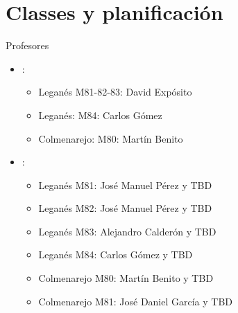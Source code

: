 \section{Classes y planificación}

\begin{frame}[t]{Profesores}
\begin{itemize}
  \item {}: 
    \begin{itemize}
      \item Leganés M81-82-83: David Expósito
      \item Leganés: M84: Carlos Gómez
      \item Colmenarejo: M80: Martín Benito
    \end{itemize}
  \item {}: 
    \begin{itemize}
      \item Leganés M81: José Manuel Pérez y TBD
      \item Leganés M82: José Manuel Pérez y TBD
      \item Leganés M83: Alejandro Calderón y TBD
      \item Leganés M84: Carlos Gómez y TBD
      \item Colmenarejo M80: Martín Benito y TBD
      \item Colmenarejo M81: José Daniel García y TBD
    \end{itemize}
\end{itemize}
\end{frame}

